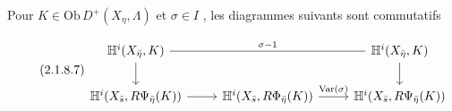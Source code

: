 Pour $K \in \mathrm{Ob}\, D^+(X_\eta, \Lambda)$ et $\sigma \in I$ , les diagrammes suivants sont commutatifs

\begin{equation}\tag{2.1.8.7}
\begin{tikzcd}
\mathbb{H}^i(X_{\bar{\eta}}, K) \arrow[rr, dash, "\sigma-1"] \arrow[d] & & \mathbb{H}^i(X_{\bar{\eta}}, K) \arrow[d] \\
\mathbb{H}^i(X_{\bar{s}}, R\Psi_{\bar{\eta}}(K)) \arrow[r] & \mathbb{H}^i(X_{\bar{s}}, R\Phi_{\bar{\eta}}(K)) \arrow[r, "\mathrm{Var}(\sigma)"] & \mathbb{H}^i(X_{\bar{s}}, R\Psi_{\bar{\eta}}(K))
\end{tikzcd}
\end{equation}
